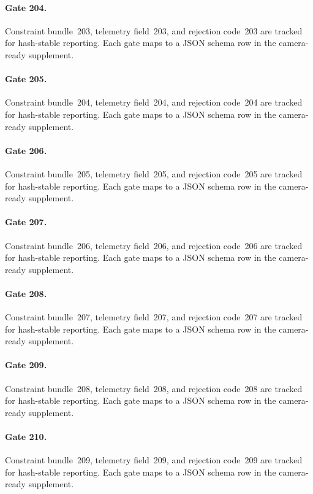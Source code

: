 \documentclass[sigconf,nonacm]{acmart}
\begin{document}
\paragraph{Gate 204.}
Constraint bundle~203, telemetry field~203, and rejection code~203 are tracked for hash-stable reporting. Each gate maps to a JSON schema row in the camera-ready supplement. %

\paragraph{Gate 205.}
Constraint bundle~204, telemetry field~204, and rejection code~204 are tracked for hash-stable reporting. Each gate maps to a JSON schema row in the camera-ready supplement. %

\paragraph{Gate 206.}
Constraint bundle~205, telemetry field~205, and rejection code~205 are tracked for hash-stable reporting. Each gate maps to a JSON schema row in the camera-ready supplement. %

\paragraph{Gate 207.}
Constraint bundle~206, telemetry field~206, and rejection code~206 are tracked for hash-stable reporting. Each gate maps to a JSON schema row in the camera-ready supplement. %

\paragraph{Gate 208.}
Constraint bundle~207, telemetry field~207, and rejection code~207 are tracked for hash-stable reporting. Each gate maps to a JSON schema row in the camera-ready supplement. %

\paragraph{Gate 209.}
Constraint bundle~208, telemetry field~208, and rejection code~208 are tracked for hash-stable reporting. Each gate maps to a JSON schema row in the camera-ready supplement. %

\paragraph{Gate 210.}
Constraint bundle~209, telemetry field~209, and rejection code~209 are tracked for hash-stable reporting. Each gate maps to a JSON schema row in the camera-ready supplement. %
\end{document}
